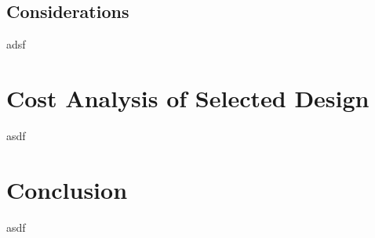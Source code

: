 \documentclass[journal]{IEEEtran}
\begin{document}
\subsection{Considerations}

adsf

\section{Cost Analysis of Selected Design}

asdf

\section{Conclusion}

asdf

\end{document}
